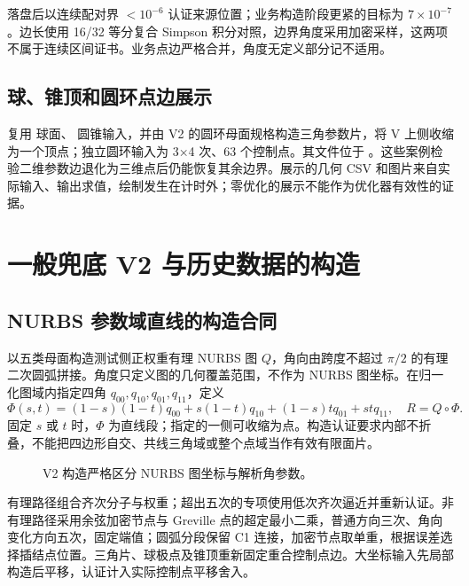 \documentclass[UTF8,zihao=5,fontset=windows,a4paper]{ctexart}
\newcommand{\code}[1]{\texttt{\detokenize{#1}}}
\begin{document}
落盘后以连续配对界 $<10^{-6}$ 认证来源位置；业务构造阶段更紧的目标为 $7\times10^{-7}$。边长使用 16/32 等分复合 Simpson 积分对照，边界角度采用加密采样，这两项不属于连续区间证书。业务点边严格合并，角度无定义部分记不适用。

\subsection{球、锥顶和圆环点边展示}
 复用 \code{iso:317} 球面、\code{iso:217} 圆锥输入，并由 V2 的圆环母面规格构造三角参数片，将 V 上侧收缩为一个顶点；独立圆环输入为 3×4 次、63 个控制点。其文件位于 。这些案例检验二维参数边退化为三维点后仍能恢复其余边界。展示的几何 CSV 和图片来自实际输入、输出求值，绘制发生在计时外；零优化的展示不能作为优化器有效性的证据。

\newpage
\section{一般兜底 V2 与历史数据的构造}
\subsection{NURBS 参数域直线的构造合同}
以五类母面构造测试侧正权重有理 NURBS 图 $Q$，角向由跨度不超过 $\pi/2$ 的有理二次圆弧拼接。角度只定义图的几何覆盖范围，不作为 NURBS 图坐标。在归一化图域内指定四角 $q_{00},q_{10},q_{01},q_{11}$，定义
\begin{equation}
\Phi(s,t)=(1-s)(1-t)q_{00}+s(1-t)q_{10}+(1-s)tq_{01}+stq_{11},
\quad R=Q\circ\Phi.
\end{equation}
固定 $s$ 或 $t$ 时，$\Phi$ 为直线段；指定的一侧可收缩为点。构造认证要求内部不折叠，不能把四边形自交、共线三角域或整个点域当作有效有限面片。

\begin{figure}[h]\centering
{}
\caption{V2 构造严格区分 NURBS 图坐标与解析角参数。}
\end{figure}
有理路径组合齐次分子与权重；超出五次的专项使用低次齐次逼近并重新认证。非有理路径采用余弦加密节点与 Greville 点的超定最小二乘，普通方向三次、角向变化方向五次，固定端值；圆弧分段保留 C1 连接，加密节点取单重，根据误差选择插结点位置。三角片、球极点及锥顶重新固定重合控制点边。大坐标输入先局部构造后平移，认证计入实际控制点平移舍入。
\end{document}
